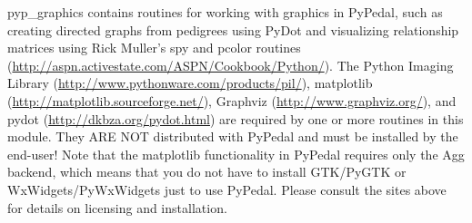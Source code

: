 \label{sec:pyp-graphics}
pyp\_graphics contains routines for working with graphics in PyPedal, such as creating directed graphs from pedigrees using PyDot and visualizing relationship matrices using Rick Muller's spy and pcolor routines (\url{http://aspn.activestate.com/ASPN/Cookbook/Python/}). The Python Imaging Library (\url{http://www.pythonware.com/products/pil/}), matplotlib (\url{http://matplotlib.sourceforge.net/}), Graphviz (\url{http://www.graphviz.org/}), and pydot (\url{http://dkbza.org/pydot.html}) are required by one or more routines in this module. They ARE NOT distributed with PyPedal and must be installed by the end-user! Note that the matplotlib functionality in PyPedal requires only the Agg backend, which means that you do not have to install GTK/PyGTK or WxWidgets/PyWxWidgets just to use PyPedal. Please consult the sites above for details on licensing and installation.

